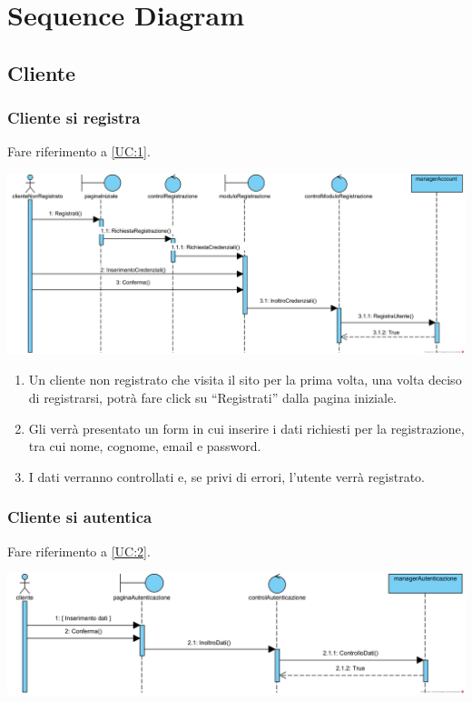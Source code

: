 \documentclass[12pt,a4paper]{article}
\begin{document}
\newpage

\section{Sequence Diagram}
\subsection{Cliente}
\subsubsection{Cliente si registra}
\label{SD:registrazione}

Fare riferimento a \ref{UC:1}. \\

\begin{center}
\includegraphics[width=\textwidth]{SequenceDiagram/ClienteRegistrazione}
\end{center}

\begin{enumerate}
\item Un cliente non registrato che visita il sito per la prima volta, una volta deciso di registrarsi, potrà fare click su ``Registrati'' dalla pagina iniziale.
\item Gli verrà presentato un form in cui inserire i dati richiesti per la registrazione, tra cui nome, cognome, email e password.
\item I dati verranno controllati e, se privi di errori, l'utente verrà registrato.
\end{enumerate}

\subsubsection{Cliente si autentica}
\label{SD:login}

Fare riferimento a \ref{UC:2}. \\

\begin{center}
\includegraphics[width=\textwidth]{SequenceDiagram/ClienteAutenticazione}
\end{center}
\end{document}
